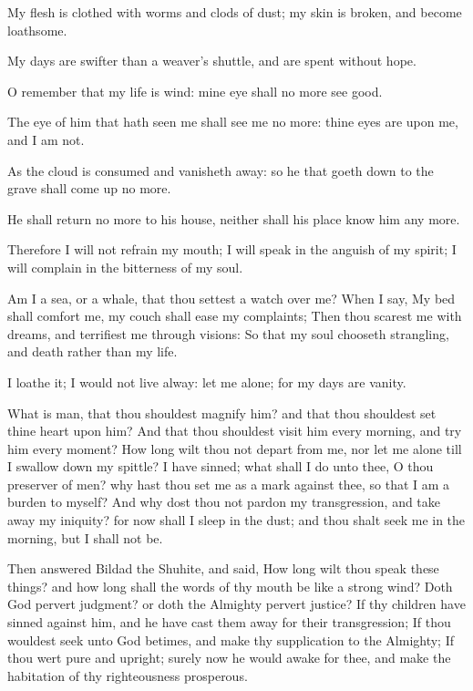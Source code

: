 \Verse My flesh is clothed with worms and clods of dust; my skin is broken, and become loathsome.

\Verse My days are swifter than a weaver's shuttle, and are spent without hope.

\Verse O remember that my life is wind: mine eye shall no more see good.

\Verse The eye of him that hath seen me shall see me no more: thine eyes are upon me, and I am not.

\Verse As the cloud is consumed and vanisheth away: so he that goeth down to the grave shall come up no more.

\Verse He shall return no more to his house, neither shall his place know him any more.

\Verse Therefore I will not refrain my mouth; I will speak in the anguish of my spirit; I will complain in the bitterness of my soul.

\Verse Am I a sea, or a whale, that thou settest a watch over me?  \Verse When I say, My bed shall comfort me, my couch shall ease my complaints; \Verse Then thou scarest me with dreams, and terrifiest me through visions: \Verse So that my soul chooseth strangling, and death rather than my life.

\Verse I loathe it; I would not live alway: let me alone; for my days are vanity.

\Verse What is man, that thou shouldest magnify him? and that thou shouldest set thine heart upon him?  \Verse And that thou shouldest visit him every morning, and try him every moment?  \Verse How long wilt thou not depart from me, nor let me alone till I swallow down my spittle?  \Verse I have sinned; what shall I do unto thee, O thou preserver of men?  why hast thou set me as a mark against thee, so that I am a burden to myself?  \Verse And why dost thou not pardon my transgression, and take away my iniquity? for now shall I sleep in the dust; and thou shalt seek me in the morning, but I shall not be.


\Chapter
\Verse Then answered Bildad the Shuhite, and said, \Verse How long wilt thou speak these things? and how long shall the words of thy mouth be like a strong wind?  \Verse Doth God pervert judgment? or doth the Almighty pervert justice?  \Verse If thy children have sinned against him, and he have cast them away for their transgression; \Verse If thou wouldest seek unto God betimes, and make thy supplication to the Almighty; \Verse If thou wert pure and upright; surely now he would awake for thee, and make the habitation of thy righteousness prosperous.

